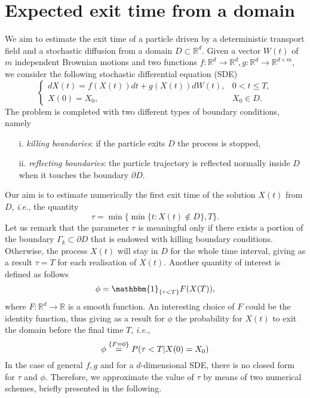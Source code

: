 \section{Expected exit time from a domain}
We aim to estimate the exit time of a particle driven by a deterministic transport field and a stochastic diffusion from a domain $D \subset \mathbb{R}^d$. Given a vector $W(t)$ of $m$ independent Brownian motions and two functions $f\colon \mathbb{R}^d \rightarrow \mathbb{R}^d, g \colon \mathbb{R}^d \rightarrow \mathbb{R}^{d\times m}$, we consider the following stochastic differential equation (SDE)
\begin{equation}\label{eq:GeneralModel}
\begin{cases}
	dX(t) = f(X(t)) dt + g(X(t))dW(t), & 0 < t \leq T, \\
	X(0)  = X_0, & X_0 \in D.
\end{cases}
\end{equation}
The problem is completed with two different types of boundary conditions, namely
\begin{itemize}
	\item[i.]  \textit{killing boundaries}: if the particle exits $D$ the process is stopped,
	\item[ii.] \textit{reflecting boundaries}: the particle trajectory is reflected normally inside $D$ when it touches the boundary $\partial D$.
\end{itemize}
Our aim is to estimate numerically the first exit time of the solution $X(t)$ from $D$, \textit{i.e.}, the quantity
\begin{equation}\label{eq:GeneralTau}
	\tau = \min\{\min\{t\colon X(t)\notin D\},T\}.
\end{equation}
Let us remark that the parameter $\tau$ is meaningful only if there exists a portion of the boundary $\Gamma_k \subset \partial D$ that is endowed with killing boundary conditions. Otherwise, the process $X(t)$ will stay in $D$ for the whole time interval, giving as a result $\tau = T$ for each realisation of $X(t)$. Another quantity of interest is defined as follows
\begin{equation}\label{eq:GeneralPhi}
	\phi = \mathbbm{1}_{\{\tau<T\}}F(X(T)),
\end{equation}
where $F\colon \mathbb{R}^d \rightarrow \mathbb{R}$ is a smooth function. An interesting choice of $F$ could be the identity function, thus giving as a result for $\phi$ the probability for $X(t)$ to exit the domain before the final time $T$, \textit{i.e.}, 
\begin{equation}\label{eq:ExitProb}
	\phi \stackrel{\{F\equiv0\}}{=} P(\tau < T | X(0) = X_0)
\end{equation}
In the case of general $f,g$ and for a $d$-dimensional SDE, there is no closed form for $\tau$ and $\phi$. Therefore, we approximate the value of $\tau$ by means of two numerical schemes, briefly presented in the following.





